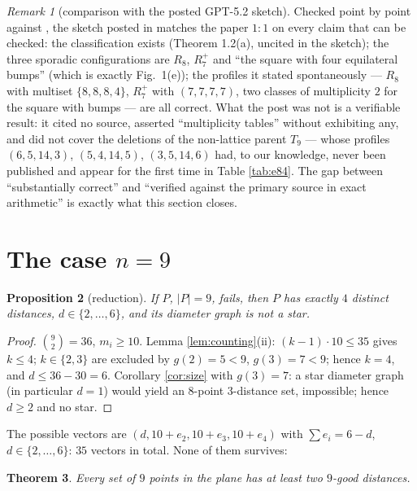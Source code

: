 \documentclass[11pt]{article}
\newtheorem{theorem}{Theorem}[section]
\newtheorem{proposition}[theorem]{Proposition}
\theoremstyle{definition}
\theoremstyle{remark}
\newtheorem{remark}[theorem]{Remark}
\begin{document}
\begin{remark}[comparison with the posted GPT-5.2 sketch]\label{rem:gpt}
Checked point by point against \cite{Shinohara08}, the sketch posted in
\cite{Chojecki26} matches the paper $1{:}1$ on every claim that can be checked: the
classification exists (Theorem 1.2(a), uncited in the sketch); the three sporadic
configurations are $R_8$, $R_7^+$ and ``the square with four equilateral bumps''
(which is exactly Fig.~1(e)); the profiles it stated spontaneously --- $R_8$ with
multiset $\{8,8,8,4\}$, $R_7^+$ with $(7,7,7,7)$, two classes of multiplicity $2$ for
the square with bumps --- are all correct. What the post was not is a verifiable
result: it cited no source, asserted ``multiplicity tables'' without exhibiting any,
and did not cover the deletions of the non-lattice parent $T_9$ --- whose profiles
$(6,5,14,3)$, $(5,4,14,5)$, $(3,5,14,6)$ had, to our knowledge, never been published
and appear for the first time in Table \ref{tab:e84}. The gap between ``substantially
correct'' and ``verified against the primary source in exact arithmetic'' is exactly
what this section closes.
\end{remark}

\section{The case $n = 9$}\label{sec:n9}

\begin{proposition}[reduction]\label{prop:n9red}
If $P$, $|P| = 9$, fails, then $P$ has exactly $4$ distinct distances,
$d \in \{2, \dots, 6\}$, and its diameter graph is not a star.
\end{proposition}

\begin{proof}
$\binom{9}{2} = 36$, $m_i \ge 10$. Lemma \ref{lem:counting}(ii): $(k-1) \cdot 10 \le 35$
gives $k \le 4$; $k \in \{2,3\}$ are excluded by $g(2) = 5 < 9$, $g(3) = 7 < 9$; hence
$k = 4$, and $d \le 36 - 30 = 6$. Corollary \ref{cor:size} with $g(3) = 7$: a star
diameter graph (in particular $d = 1$) would yield an $8$-point $3$-distance set,
impossible; hence $d \ge 2$ and no star.
\end{proof}

The possible vectors are $(d, 10+e_2, 10+e_3, 10+e_4)$ with $\sum e_i = 6 - d$,
$d \in \{2, \dots, 6\}$: $35$ vectors in total. None of them survives:

\begin{theorem}\label{thm:n9}
Every set of $9$ points in the plane has at least two $9$-good distances.
\end{theorem}
\end{document}

